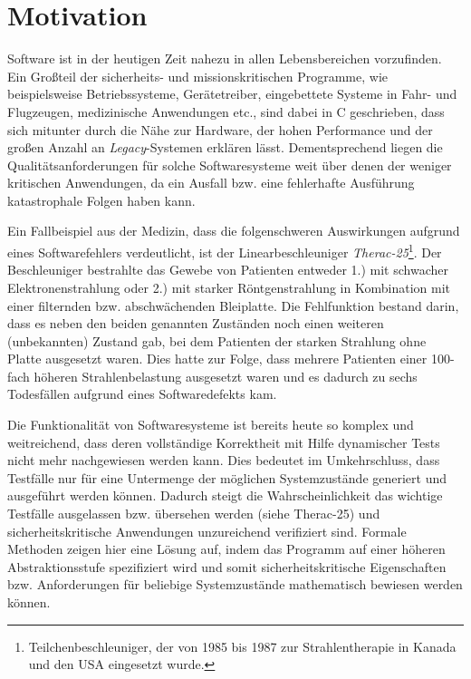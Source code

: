 \section{Motivation}


Software ist in der heutigen Zeit nahezu in allen Lebensbereichen vorzufinden. Ein Großteil der sicherheits- und missionskritischen Programme, wie beispielsweise Betriebssysteme, Gerätetreiber, eingebettete Systeme in Fahr- und Flugzeugen, medizinische Anwendungen etc.,  sind dabei in C geschrieben, dass sich mitunter durch die Nähe zur Hardware, der hohen Performance und der großen Anzahl an \emph{Legacy}-Systemen erklären lässt. Dementsprechend liegen die Qualitätsanforderungen für solche Softwaresysteme weit über denen der weniger kritischen Anwendungen, da ein Ausfall bzw. eine fehlerhafte Ausführung katastrophale Folgen haben kann.


Ein Fallbeispiel aus der Medizin, dass die folgenschweren Auswirkungen aufgrund eines Softwarefehlers verdeutlicht, ist der Linearbeschleuniger \emph{Therac-25}\footnote{Teilchenbeschleuniger, der von 1985 bis 1987 zur Strahlentherapie in Kanada und den USA eingesetzt wurde.}. Der Beschleuniger bestrahlte das Gewebe von Patienten entweder 1.) mit schwacher Elektronenstrahlung oder 2.) mit starker Röntgenstrahlung in Kombination mit einer filternden bzw. abschwächenden Bleiplatte. Die Fehlfunktion bestand darin, dass es neben den beiden genannten Zuständen noch einen weiteren (unbekannten) Zustand gab, bei dem Patienten der starken Strahlung ohne Platte ausgesetzt waren. Dies hatte zur Folge, dass mehrere Patienten einer 100-fach höheren Strahlenbelastung ausgesetzt waren und es dadurch zu sechs Todesfällen aufgrund eines Softwaredefekts kam. \cite{Pfeifer2003}


Die Funktionalität von Softwaresysteme ist bereits heute so komplex und weitreichend, dass deren vollständige Korrektheit mit Hilfe dynamischer Tests nicht mehr nachgewiesen werden kann. Dies bedeutet im Umkehrschluss, dass Testfälle nur für eine Untermenge der möglichen Systemzustände generiert und ausgeführt werden können. Dadurch steigt die Wahrscheinlichkeit das wichtige Testfälle ausgelassen bzw. übersehen werden (siehe Therac-25) und sicherheitskritische Anwendungen unzureichend verifiziert sind. Formale Methoden zeigen hier eine Lösung auf, indem das Programm auf einer höheren Abstraktionsstufe spezifiziert wird und somit sicherheitskritische Eigenschaften bzw. Anforderungen für beliebige Systemzustände mathematisch bewiesen werden können. \cite{Crocker2007}
